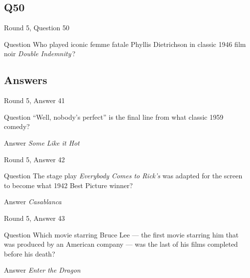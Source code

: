 \documentclass[11pt]{beamer}
\begin{document}
\subsection*{Q50}
\begin{frame}[t]{Round 5, Question 50}
\vspace{2em}
\begin{block}{Question}
Who played iconic femme fatale Phyllis Dietrichson in classic 1946 film noir \emph{Double Indemnity}\,?
\end{block}
\end{frame}
    
\subsection{Answers}

\begin{frame}[t]{Round 5, Answer 41}
\vspace{2em}
\begin{block}{Question}
``Well, nobody's perfect'' is the final line from what classic 1959 comedy?
\end{block}
\pause{}
\begin{block}{Answer}
\emph{Some Like it Hot}
\end{block}
\end{frame}
    

\begin{frame}[t]{Round 5, Answer 42}
\vspace{2em}
\begin{block}{Question}
The stage play \emph{Everybody Comes to Rick's} was adapted for the screen to become what 1942 Best Picture winner?
\end{block}
\pause{}
\begin{block}{Answer}
\emph{Casablanca}
\end{block}
\end{frame}
    

\begin{frame}[t]{Round 5, Answer 43}
\vspace{2em}
\begin{block}{Question}
Which movie starring Bruce Lee — the first movie starring him that was produced by an American company — was the last of his films completed before his death?
\end{block}
\pause{}
\begin{block}{Answer}
\emph{Enter the Dragon}
\end{block}
\end{frame}
    
\end{document}
